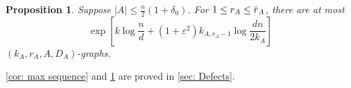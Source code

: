 \documentclass[11pt]{article}
\newcommand{\jc}[1]{{\color{blue}[Jane: #1]}}
\newcommand{\overbar}[1]{\mkern 1.5mu\overline{\mkern-1.5mu#1\mkern-1.5mu}\mkern 1.5mu}
\theoremstyle{plain}
\newtheorem{lem}[thm]{Lemma}
\newtheorem{prop}[thm]{Proposition}
\begin{document}



\begin{prop}\label{cor: counting defects}
    Suppose $|A| \leq \frac{n}{2}(1 + \delta_0)$. For $1 \leq r_A \leq \overbar{r}_{A}$, there are at most
    \[
        \exp\left[k\log\frac{n}{d} + (1 + \varepsilon^2)k_{A, r_A-1}\log\frac{dn}{2k_A}\right]
    \]
    $(k_A, r_A, A, D_{A})$-graphs.    
\end{prop}

\cref{cor: max sequence} and \cref{cor: counting defects} are proved in \cref{sec: Defects}. \medskip





\end{document}

